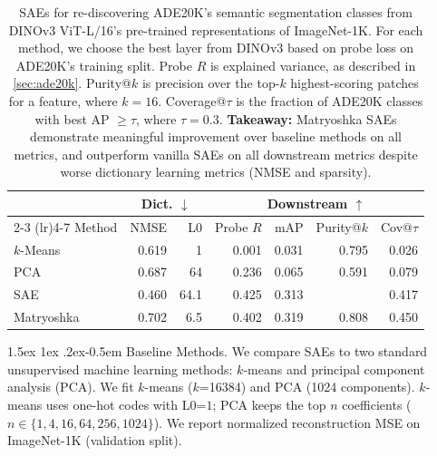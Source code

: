 \documentclass[10pt,twocolumn,letterpaper]{article}
\makeatletter
\renewcommand{\paragraph}{%
  \@startsection{paragraph}{4}%
  {\z@}{1.5ex \@plus 1ex \@minus .2ex}{-0.5em}%
  {\normalfont\normalsize\bfseries}%
}
\makeatother
\begin{document}
\begin{table}[t]
    \centering
    \small
    \setlength{\tabcolsep}{3pt}
    \caption{SAEs for re-discovering ADE20K's semantic segmentation classes from DINOv3 ViT-L/16's pre-trained representations of ImageNet-1K.
    For each method, we choose the best layer from DINOv3 based on probe loss on ADE20K's training split.
    Probe $R$ is explained variance, as described in \cref{sec:ade20k}.
    Purity@$k$ is precision over the top-$k$ highest-scoring patches for a feature, where $k=16$.
    Coverage@$\tau$ is the fraction of ADE20K classes with best AP $\geq\tau$, where $\tau= 0.3$.
    \textbf{Takeaway:} Matryoshka SAEs demonstrate meaningful improvement over baseline methods on all metrics, and outperform vanilla SAEs on all downstream metrics despite worse dictionary learning metrics (NMSE and sparsity).}
    \label{tab:ade20k}
    \begin{tabular}{lrrrrrr}
    \toprule
    & \multicolumn{2}{c}{Dict. $\downarrow$} & \multicolumn{4}{c}{Downstream $\uparrow$} \\
    \cmidrule(lr){2-3} \cmidrule(lr){4-7}
    Method & NMSE & L0 & Probe $R$ & mAP & Purity@$k$ & Cov@$\tau$ \\
    \midrule
    $k$-Means & 0.619 & 1 & 0.001 & 0.031 & 0.795 & 0.026 \\  %
    PCA & 0.687 & 64 & 0.236 & 0.065 & 0.591 & 0.079 \\ %
    SAE        & 0.460 & 64.1 & 0.425 & 0.313 & & 0.417 \\  %
    Matryoshka & 0.702 &   6.5 & 0.402 & 0.319 & 0.808 & 0.450 \\  %
    \bottomrule
    \end{tabular}
\end{table}

\paragraph{Baseline Methods.}
We compare SAEs to two standard unsupervised machine learning methods: $k$-means and principal component analysis (PCA).
We fit $k$-means ($k$=\num{16384}) and PCA (\num{1024} components).
$k$-means uses one-hot codes with L$0$=$1$; PCA keeps the top $n$ coefficients ($n \in \{1,4,16,64,256,1024\}$).
We report normalized reconstruction MSE on ImageNet-1K (validation split).
\end{document}
